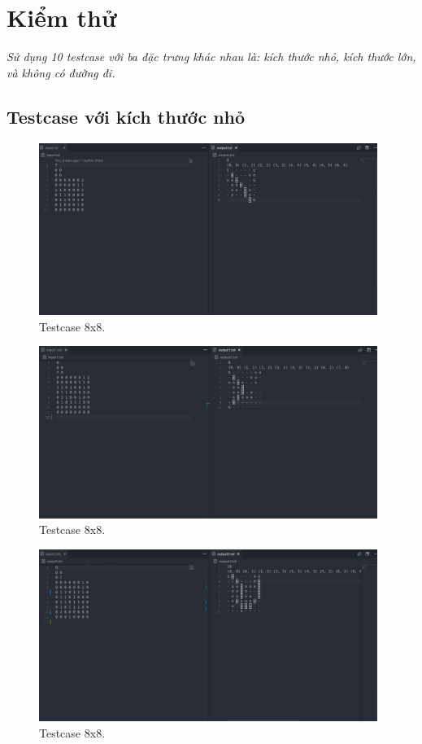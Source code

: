 \section{Kiểm thử}
\textit{Sử dụng 10 testcase với ba đặc trưng khác nhau là: kích thước nhỏ, kích thước lớn, và không có đường đi.}

\subsection{Testcase với kích thước nhỏ}

\begin{figure}[H]
\centering
\includegraphics[width=0.98\textwidth]{t0.png}
\caption{Testcase 8x8.}
\end{figure}

\begin{figure}[H]
\centering
\includegraphics[width=0.98\textwidth]{t1.png}
\caption{Testcase 8x8.}
\end{figure}

\begin{figure}[H]
\centering
\includegraphics[width=0.98\textwidth]{t2.png}
\caption{Testcase 8x8.}
\end{figure}

